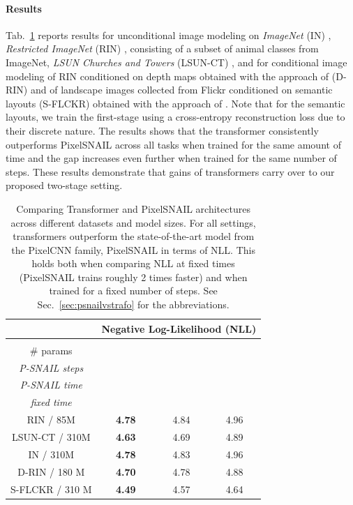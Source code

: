 \paragraph{Results} Tab.~\ref{tab:gptvspixelsnail} reports results for unconditional image modeling on \emph{ImageNet} (IN) \cite{deng2009imagenet}, \emph{Restricted ImageNet} (RIN) \cite{santurkar2019computer}, consisting of a subset of animal classes from ImageNet, \emph{LSUN Churches and Towers} (LSUN-CT) \cite{yu15lsun}, and for conditional image modeling of RIN conditioned on depth maps obtained with the approach of \cite{Ranftl2020} (D-RIN) and of landscape images collected from Flickr conditioned on semantic layouts (S-FLCKR) obtained with the approach of \cite{chen2017deeplab}. Note that for the semantic layouts, we train the first-stage using a cross-entropy reconstruction loss due to their discrete nature. The results shows that the transformer consistently outperforms PixelSNAIL across all tasks when trained for the same amount of time and the gap increases even further when trained for the same number of steps. These results demonstrate that gains of transformers carry over to our proposed two-stage setting.

\begin{table}[tbp]
\centering
\begin{tabular}{c ccc}
 & \multicolumn{3}{c}{Negative Log-Likelihood (NLL)} \\
\toprule

\shortstack{\footnotesize{Data} / \\ \footnotesize{\# params}} & \shortstack{\footnotesize{Transformer}\\ \footnotesize{\emph{P-SNAIL steps}}} & \shortstack{\footnotesize{Transformer} \\ \footnotesize{\emph{P-SNAIL time}}} & \shortstack{\footnotesize{PixelSNAIL} \\ \footnotesize{\emph{fixed time}}} \\

\midrule
\footnotesize{RIN / 85M} & \textbf{4.78} & 4.84 & 4.96 \\   
\footnotesize{LSUN-CT / 310M} & \textbf{4.63} & 4.69 & 4.89 \\   
\footnotesize{IN / 310M} & \textbf{4.78} & 4.83 & 4.96 \\   

\midrule
\footnotesize{D-RIN / 180 M} & \textbf{4.70} & 4.78 & 4.88 \\  
\footnotesize{S-FLCKR / 310 M} & \textbf{4.49} & 4.57 & 4.64 \\   
\bottomrule
\end{tabular}
\caption{Comparing Transformer and PixelSNAIL architectures across different datasets and model sizes. For all settings,
  transformers outperform the state-of-the-art model from the PixelCNN family,
  PixelSNAIL in terms of NLL. This holds both when comparing NLL at fixed times
  (PixelSNAIL trains roughly 2 times faster) and when trained for a fixed
  number of steps. See Sec.~\ref{sec:psnailvstrafo} for the abbreviations.
}
\label{tab:gptvspixelsnail}
\end{table}


